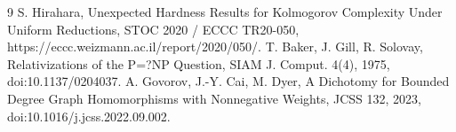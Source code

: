 \documentclass[11pt]{article}
\begin{document}
\begin{thebibliography}{9}
 S. Hirahara, Unexpected Hardness Results for Kolmogorov Complexity Under Uniform Reductions, STOC 2020 / ECCC TR20-050, https://eccc.weizmann.ac.il/report/2020/050/.
 T. Baker, J. Gill, R. Solovay, Relativizations of the P=?NP Question, SIAM J. Comput. 4(4), 1975, doi:10.1137/0204037.
 A. Govorov, J.-Y. Cai, M. Dyer, A Dichotomy for Bounded Degree Graph Homomorphisms with Nonnegative Weights, JCSS 132, 2023, doi:10.1016/j.jcss.2022.09.002.
\end{thebibliography}
\end{document}
